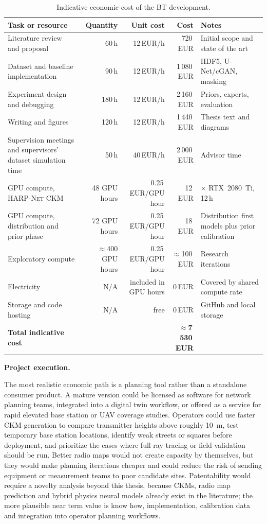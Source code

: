 \begin{table}[htbp]
\centering
\footnotesize
\renewcommand{\arraystretch}{1.08}
\caption{Indicative economic cost of the BT development.}
\label{tab:sustainability_budget}
\begin{tabularx}{\textwidth}{>{\raggedright\arraybackslash}Xrrr>{\raggedright\arraybackslash}p{3cm}}
\toprule
Task or resource & Quantity & Unit cost & Cost & Notes \\
\midrule
Literature review and proposal & 60\,h & 12\,EUR/h & 720\,EUR & Initial scope and state of the art \\
Dataset and baseline implementation & 90\,h & 12\,EUR/h & 1\,080\,EUR & HDF5, U-Net/cGAN, masking \\
Experiment design and debugging & 180\,h & 12\,EUR/h & 2\,160\,EUR & Priors, experts, evaluation \\
Writing and figures & 120\,h & 12\,EUR/h & 1\,440\,EUR & Thesis text and diagrams \\
Supervision meetings and supervisors' dataset simulation time & 50\,h & 40\,EUR/h & 2\,000\,EUR & Advisor time \\
GPU compute, \textsc{HARP-Net CKM} & 48 GPU hours & 0.25\,EUR/GPU hour & 12\,EUR & 4$\times$ RTX~2080~Ti, 12\,h \\
GPU compute, distribution and prior phase & 72 GPU hours & 0.25\,EUR/GPU hour & 18\,EUR & Distribution first models plus prior calibration \\
Exploratory compute & $\approx$400 GPU hours & 0.25\,EUR/GPU hour & $\approx$100\,EUR & Research iterations \\
Electricity & N/A & included in GPU hours & 0\,EUR & Covered by shared compute rate \\
Storage and code hosting & N/A & free & 0\,EUR & GitHub and local storage \\
\midrule
\textbf{Total indicative cost} & & & \textbf{$\approx$7\,530\,EUR} & \\
\bottomrule
\end{tabularx}
\end{table}

\textbf{Project execution.}

The most realistic economic path is a planning tool rather than a standalone
consumer product. A mature version could be licensed as software for network
planning teams, integrated into a digital twin workflow, or offered as a
service for rapid elevated base station or UAV coverage studies. Operators
could use faster CKM generation to compare transmitter heights above roughly
\SI{10}{m}, test temporary base station locations, identify weak streets or
squares before deployment, and prioritize the cases where full ray tracing or
field validation should be run. Better radio maps would
not create capacity by themselves, but they would make planning iterations
cheaper and could reduce the risk of sending equipment or measurement teams to
poor candidate sites. Patentability would require a novelty analysis beyond
this thesis, because CKMs, radio map prediction and hybrid physics neural
models already exist in the literature; the more plausible near term value is
know how, implementation, calibration data and integration into operator
planning workflows.


